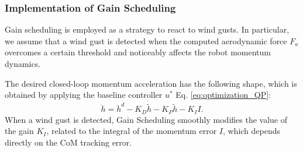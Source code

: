\subsubsection*{Implementation of Gain Scheduling}

Gain scheduling is employed as a strategy to react to wind gusts. In particular, we assume that a wind gust is detected when the computed aerodynamic force $F_a$ overcomes a certain threshold and noticeably affects the robot momentum dynamics.

The desired closed-loop momentum acceleration has the following shape, which is obtained by applying the baseline controller $u^*$ Eq. \eqref{eq:optimization_QP}:
\begin{equation}
\label{eq:hddot_des}
   \ddot{h} = \ddot{h}^d -K_D\dot{\tilde{h}} -K_P\tilde{{h}} -K_I I.
\end{equation}
When a wind gust is detected, Gain Scheduling smoothly modifies the value of the gain $K_I$, related to the integral of the momentum error $I$, which depends directly on the CoM tracking error.


